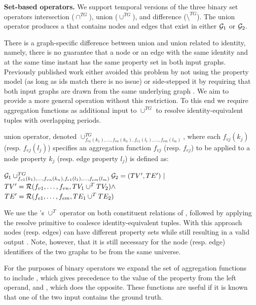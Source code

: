 {\bf Set-based operators.}  We support temporal versions of the three binary set operators
intersection ($\cap^{TG}$), union ($\cup^{TG}$), and difference
($\setminus^{TG}$).  The union operator produces a \tg that contains
nodes and edges that exist in either $\mathcal{G}_1$ or $\mathcal{G}_2$.

There is a graph-specific difference between \tra union and \tga union
related to identity, namely, there is no guarantee that a node or an
edge with the same identity and at the same time instant has the same
property set in both input graphs.  Previously published work either
avoided this problem by not using the property model (as long as ids
match there is no issue) or side-stepped it by requiring that both
input graphs are drawn from the same underlying graph
.  We aim to provide a more general operation
without this restriction.  To this end we require aggregation
functions as additional input to $\cup^{TG}$ to resolve
identity-equivalent tuples with overlapping periods.

\begin{definition}[Union]
\label{def:uniontg}
\tg union operator, denoted $\cup^{TG}_{f_{v1}(k_1),\ldots,f_{vn}(k_n),f_{e1}(l_1),\ldots,f_{em}(l_m)}$,
where each $f_{vj}(k_j)$ (resp. $f_{ej}(l_j)$) specifies an aggregation
function $f_{vj}$ (resp. $f_{ej}$) to be applied to a node property
$k_j$ (resp. edge property $l_j$) is defined as:

$\mathcal{G}_1 \cup^{TG}_{f_{v1}(k_1),\ldots,f_{vn}(k_n),f_{e1}(l_1),\ldots,f_{em}(l_m)} \mathcal{G}_2 = (TV', TE') ~|~$\\$TV' = \mathcal{R}(f_{v1},\ldots,f_{vn},TV_1 \cup^T TV_2) \land$\\$TE' = \mathcal{R}(f_{e1},\ldots,f_{em},TE_1 \cup^T TE_2)$
\end{definition}

We use the \tra's $\cup^T$ operator on both constituent relations of
\ttt, followed by applying the resolve primitive to coalesce
identity-equivalent tuples.  With this approach nodes (resp. edges)
can have different property sets while still resulting in a valid
output \tg.  Note, however, that it is still necessary for the node
(resp. edge) identifiers of the two graphs to be from the same
universe.

For the purposes of binary operators we expand the set of aggregation
functions to include , which gives precedence to the value
of the property from the left operand, and , which does
the opposite.  These functions are useful if it is known that one of
the two input \tgs contains the ground truth.


